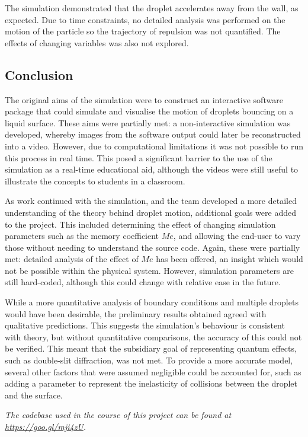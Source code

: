 The simulation demonstrated that the droplet accelerates away from the wall, as expected. Due to time constraints, no detailed analysis was performed on the motion of the particle so the trajectory of repulsion was not quantified. The effects of changing variables was also not explored.


\subsection{Conclusion}

The original aims of the simulation were to construct an interactive software package that could simulate and visualise the motion of droplets bouncing on a liquid surface. These aims were partially met: a non-interactive simulation was developed, whereby images from the software output could later be reconstructed into a video. However, due to computational limitations it was not possible to run this process in real time. This posed a significant barrier to the use of the simulation as a real-time educational aid, although the videos were still useful to illustrate the concepts to students in a classroom.

As work continued with the simulation, and the team developed a more detailed understanding of the theory behind droplet motion, additional goals were added to the project. This included determining the effect of changing simulation parameters such as the memory coefficient $Me$, and allowing the end-user to vary those without needing to understand the source code. Again, these were partially met: detailed analysis of the effect of $Me$ has been offered, an insight which would not be possible within the physical system. However, simulation parameters are still hard-coded, although this could change with relative ease in the future.

While a more quantitative analysis of boundary conditions and multiple droplets would have been desirable, the preliminary results obtained agreed with qualitative predictions. This suggests the simulation's behaviour is consistent with theory, but without quantitative comparisons, the accuracy of this could not be verified. This meant that the subsidiary goal of representing quantum effects, such as double-slit diffraction, was not met. To provide a more accurate model, several other factors that were assumed negligible could be accounted for, such as adding a parameter to represent the inelasticity of collisions between the droplet and the surface.

\textit{The codebase used in the course of this project can be found at \url{https://goo.gl/mji4zU}.}